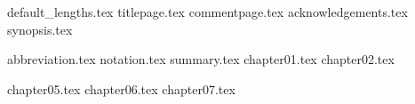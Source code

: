 \documentclass{report}
\begin{document}
	{default_lengths.tex}
	{titlepage.tex}
	{commentpage.tex}
	{acknowledgements.tex}
	{synopsis.tex}
	\setcounter{tocdepth}{1}
	\hypertarget{tocpage}{}
	\renewcommand{\baselinestretch}{0.5}\normalsize
	\tableofcontents %
	\renewcommand{\baselinestretch}{1.0}\normalsize
	\newpage{}
	\listoffigures %
	\listoftables %
	\newpage
	{abbreviation.tex}
	{notation.tex}
	{summary.tex}
	{chapter01.tex}
	{chapter02.tex}

	
	{chapter05.tex}
	{chapter06.tex}
	{chapter07.tex}
	\nocite{ben_lynn_phd}
	\nocite{pbc}
	\nocite{sodium}
	\nocite{Washington:2008:ECN:1388394}
	\nocite{Martin:2008:IIE:1370962}
	\printbibliography
\end{document}
